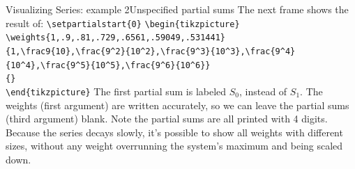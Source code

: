 \documentclass[10pt]{beamer}
\begin{document}
%
%
%
%
\begin{frame}[fragile]{Visualizing Series: example 2}{Unspecified partial sums}
The next frame shows the result of:
\vfill
\scriptsize
\verb|\setpartialstart{0}|
\verb|\begin{tikzpicture}|\\
\verb|\weights{1,.9,.81,.729,.6561,.59049,.531441}|\\
\verb|{1,\frac9{10},\frac{9^2}{10^2},\frac{9^3}{10^3},\frac{9^4}{10^4},\frac{9^5}{10^5},\frac{9^6}{10^6}}|\\
\verb|{}|\\
\verb|\end{tikzpicture}|
\normalsize
\vfill
The first partial sum is labeled $S_0$, instead of $S_1$.
\vfill
The weights (first argument) are written accurately, so we can leave the partial sums (third argument) blank. Note the partial sums are all printed with 4 digits.
\vfill
Because the series decays slowly, it's possible to show all weights with different sizes, without any weight overrunning the system's maximum and being scaled down.
\end{frame}
\end{document}
